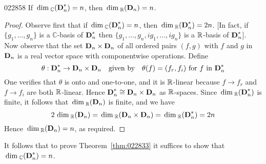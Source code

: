 \begin{lemma}{}{022858}
If $\thinspace\operatorname{dim\medspace}_\mathbb{C}(\textbf{D}_{n}^{*}) = n$, then $\thinspace\operatorname{dim\medspace}_{\mathbb{R}}(\textbf{D}_{n}) = n$.
\end{lemma}

\begin{proof}
Observe first that if $\thinspace\operatorname{dim\medspace}_\mathbb{C}(\textbf{D}_{n}^{*}) = n$, then $\thinspace\operatorname{dim\medspace}_{\mathbb{R}}(\textbf{D}_{n}^{*}) = 2n$. [In fact, if $\{g_{1}, \dots, g_{n}\}$ is a $\mathbb{C}$-basis of $\textbf{D}_{n}^{*}$ then $\{g_1, \dots, g_n, ig_1, \dots, ig_n\}$ is a $\mathbb{R}$-basis of $\textbf{D}_{n}^{*}$]. Now observe that the set $\textbf{D}_{n} \times \textbf{D}_{n}$ of all ordered pairs $(f, g)$ with $f$ and $g$ in $\textbf{D}_{n}$ is a real vector space with componentwise operations. Define
\begin{equation*}
\theta : \textbf{D}_{n}^{*} \to \textbf{D}_{n} \times \textbf{D}_{n} \quad \mbox{given by} \quad \theta(f) = (f_r, f_i) \mbox{ for } f \mbox{ in } \textbf{D}_{n}^{*}
\end{equation*}
One verifies that $\theta$ is onto and one-to-one, and it is $\mathbb{R}$-linear because $f \to f_{r}$ and $f \to f_{i}$ are both $\mathbb{R}$-linear. Hence $\textbf{D}_{n}^{*} \cong \textbf{D}_n \times \textbf{D}_n$ as $\mathbb{R}$-spaces. Since $\thinspace\operatorname{dim\medspace}_{\mathbb{R}}(\textbf{D}_{n}^{*})$ is finite, it follows that $\thinspace\operatorname{dim\medspace}_{\mathbb{R}}(\textbf{D}_{n})$ is finite, and we have
\begin{equation*}
2 \thinspace\operatorname{dim\medspace}_{\mathbb{R}}(\textbf{D}_n) = \thinspace\operatorname{dim\medspace}_{\mathbb{R}}(\textbf{D}_n \times \textbf{D}_n) = \thinspace\operatorname{dim\medspace}_{\mathbb{R}}(\textbf{D}_{n}^{*}) = 2n
\end{equation*}
Hence $\thinspace\operatorname{dim\medspace}_{\mathbb{R}}(\textbf{D}_{n}) = n$, as required.
\end{proof}

\noindent It follows that to prove Theorem~\ref{thm:022833} it suffices to show that $\thinspace\operatorname{dim\medspace}_{\mathbb{C}}(\textbf{D}_{n}^{*}) = n$.

